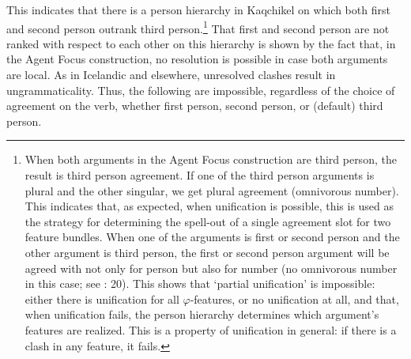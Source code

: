 \documentclass[output=paper]{langsci/langscibook}
\begin{document}
This indicates that there is a person hierarchy in Kaqchikel on which both first and second person outrank third person.\footnote{When both arguments in the Agent Focus construction are third person, the result is third person agreement. If one of the third person arguments is plural and the other singular, we get plural agreement (omnivorous number). This indicates that, as expected, when unification is possible, this is used as the strategy for determining the spell-out of a single agreement slot for two feature bundles. When one of the arguments is first or second person and the other argument is third person, the first or second person argument will be agreed with not only for person but also for number (no omnivorous number in this case; see \citealt{Preminger2014}: 20). This shows that ‘partial unification’ is impossible: either there is unification for all $\varphi $-features, or no unification at all, and that, when unification fails, the person hierarchy determines which argument’s features are realized. This is a property of unification in general: if there is a clash in any feature, it fails.} That first and second person are not ranked with respect to each other on this hierarchy is shown by the fact that, in the Agent Focus construction, no resolution is possible in case both arguments are local. As in Icelandic and elsewhere, unresolved clashes result in ungrammaticality. Thus, the following are impossible, regardless of the choice of agreement on the verb, whether first person, second person, or (default) third person.

\ea 
{}
\z
\z
\end{document}

